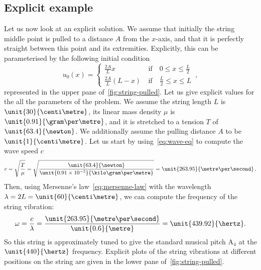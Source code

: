 \subsection{Explicit example}
Let us now look at an explicit solution. We assume that initially the string middle point
is pulled to a distance $A$ from the $x$-axis, and that it is perfectly straight between
this point and its extremities. Explicitly, this can be parameterised by the following
initial condition
\begin{equation}
  u_0(x)=
  \begin{cases}
    \frac{2A}{L}x&~\text{if}\quad 0\leq x \leq \frac{L}{2}\\
    \frac{2A}{L}(L-x)&~\text{if}\quad \frac{L}{2}\leq x \leq L
  \end{cases}\,,
  \label{eq:string-pluck-ic}
\end{equation}
represented in the upper pane of~\cref{fig:string-pulled}. Let us give explicit values for
the all the parameters of the problem. We assume the string length $L$ is
$\unit{30}{\centi\metre}$, its linear mass density $\mu$ is
$\unit{0.91}{\gram\per\metre}$, and it is stretched to a tension $T$ of
$\unit{63.4}{\newton}$. We additionally assume the pulling distance $A$ to be
$\unit{1}{\centi\metre}$. Let us start by using~\cref{eq:wave-eq} to compute the wave
speed $c$
\begin{equation}
  c=\sqrt{\frac{T}{\mu}}
  =\sqrt{\frac{\unit{63.4}{\newton}}{\unit{0.91\times 10^{-3}}{\kilo\gram\per\metre}}}
  =\unit{263.95}{\metre\per\second}\,.
\end{equation}
Then, using Mersenne's law~\cref{eq:mersenne-law} with the wavelength
$\lambda=2L=\unit{60}{\centi\metre}$, we can compute the frequency of the string
vibration:
\begin{equation}
  \omega=\frac{c}{\lambda}=\frac{\unit{263.95}{\metre\per\second}}{\unit{0.6}{\metre}}
  =\unit{439.92}{\hertz}.
\end{equation}
So this string is approximately tuned to give the standard musical pitch $\mathrm{A}_4$ at
the $\unit{440}{\hertz}$ frequency. Explicit plots of the string vibrations at different
positions on the string are given in the lower pane of~\cref{fig:string-pulled}.
